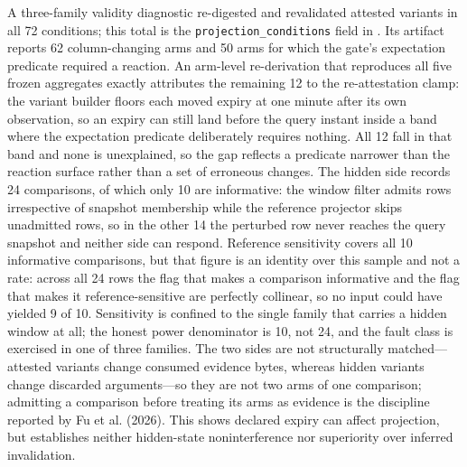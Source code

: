 \documentclass[11pt]{article}
\begin{document}
A three-family validity diagnostic re-digested and revalidated attested variants in all 72 conditions; this total is the \texttt{projection\_conditions} field in . Its artifact reports 62 column-changing arms and 50 arms for which the gate's expectation predicate required a reaction. An arm-level re-derivation that reproduces all five frozen aggregates exactly attributes the remaining 12 to the re-attestation clamp: the variant builder floors each moved expiry at one minute after its own observation, so an expiry can still land before the query instant inside a band where the expectation predicate deliberately requires nothing. All 12 fall in that band and none is unexplained, so the gap reflects a predicate narrower than the reaction surface rather than a set of erroneous changes. The hidden side records 24 comparisons, of which only 10 are informative: the window filter admits rows irrespective of snapshot membership while the reference projector skips unadmitted rows, so in the other 14 the perturbed row never reaches the query snapshot and neither side can respond. Reference sensitivity covers all 10 informative comparisons, but that figure is an identity over this sample and not a rate: across all 24 rows the flag that makes a comparison informative and the flag that makes it reference-sensitive are perfectly collinear, so no input could have yielded 9 of 10. Sensitivity is confined to the single family that carries a hidden window at all; the honest power denominator is 10, not 24, and the fault class is exercised in one of three families. The two sides are not structurally matched---attested variants change consumed evidence bytes, whereas hidden variants change discarded arguments---so they are not two arms of one comparison; admitting a comparison before treating its arms as evidence is the discipline reported by Fu et al. (2026). This shows declared expiry can affect projection, but establishes neither hidden-state noninterference nor superiority over inferred invalidation.
\end{document}
